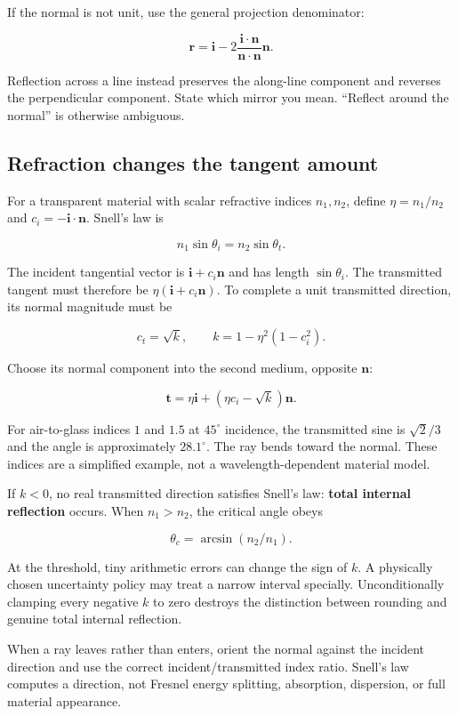 If the normal is not unit, use the general projection denominator:

\[
\mathbf r=\mathbf i-2\frac{\mathbf i\cdot\mathbf n}{\mathbf n\cdot\mathbf n}\mathbf n.
\]

Reflection across a line instead preserves the along-line component and reverses the perpendicular component. State which mirror you mean. ``Reflect around the normal'' is otherwise ambiguous.

\subsection{Refraction changes the tangent amount}\label{01-foundations-i-ch018-refraction-changes-the-tangent-amount}

For a transparent material with scalar refractive indices \(n_1,n_2\), define \(\eta=n_1/n_2\) and \(c_i=-\mathbf i\cdot\mathbf n\). Snell's law is

\[
n_1\sin\theta_i=n_2\sin\theta_t.
\]

The incident tangential vector is \(\mathbf i+c_i\mathbf n\) and has length \(\sin\theta_i\). The transmitted tangent must therefore be \(\eta(\mathbf i+c_i\mathbf n)\). To complete a unit transmitted direction, its normal magnitude must be

\[
c_t=\sqrt{k},\qquad k=1-\eta^2(1-c_i^2).
\]

Choose its normal component into the second medium, opposite \(\mathbf n\):

\[
\mathbf t=\eta\mathbf i+(\eta c_i-\sqrt{k})\mathbf n.
\]

For air-to-glass indices \(1\) and \(1.5\) at \(45^\circ\) incidence, the transmitted sine is \(\sqrt2/3\) and the angle is approximately \(28.1^\circ\). The ray bends toward the normal. These indices are a simplified example, not a wavelength-dependent material model.

If \(k<0\), no real transmitted direction satisfies Snell's law: \textbf{total internal reflection} occurs. When \(n_1>n_2\), the critical angle obeys

\[
\theta_c=\arcsin(n_2/n_1).
\]

At the threshold, tiny arithmetic errors can change the sign of \(k\). A physically chosen uncertainty policy may treat a narrow interval specially. Unconditionally clamping every negative \(k\) to zero destroys the distinction between rounding and genuine total internal reflection.

When a ray leaves rather than enters, orient the normal against the incident direction and use the correct incident/transmitted index ratio. Snell's law computes a direction, not Fresnel energy splitting, absorption, dispersion, or full material appearance.

